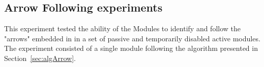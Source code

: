 \subsection{Arrow Following experiments}
\label{sec:mblocksExperimentsArrow}
This experiment tested the ability of the Modules to identify and follow the "arrows" embedded in in a set of passive and temporarily disabled active modules. The experiment consisted of a single module following the algorithm presented in Section~\ref{sec:algArrow}.

